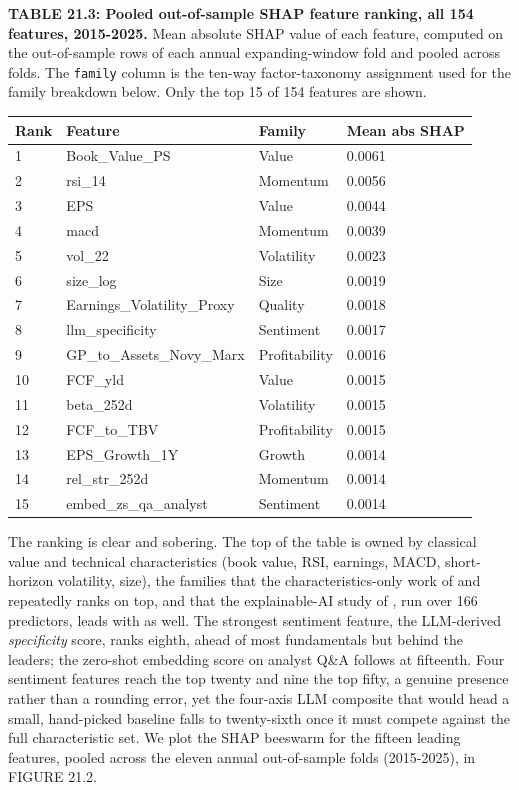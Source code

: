 \textbf{TABLE 21.3: Pooled out-of-sample SHAP feature ranking, all 154 features, 2015-2025.} Mean absolute SHAP value of each feature, computed on the out-of-sample rows of each annual expanding-window fold and pooled across folds. The \texttt{family} column is the ten-way factor-taxonomy assignment used for the family breakdown below. Only the top 15 of 154 features are shown.

\bigskip\noindent
\begin{tabular}{p{}p{}p{}p{}}
\toprule
Rank & Feature & Family & Mean abs SHAP \\
\hline
1 & Book\_Value\_PS & Value & 0.0061 \\
2 & rsi\_14 & Momentum & 0.0056 \\
3 & EPS & Value & 0.0044 \\
4 & macd & Momentum & 0.0039 \\
5 & vol\_22 & Volatility & 0.0023 \\
6 & size\_log & Size & 0.0019 \\
7 & Earnings\_Volatility\_Proxy & Quality & 0.0018 \\
8 & llm\_specificity & Sentiment & 0.0017 \\
9 & GP\_to\_Assets\_Novy\_Marx & Profitability & 0.0016 \\
10 & FCF\_yld & Value & 0.0015 \\
11 & beta\_252d & Volatility & 0.0015 \\
12 & FCF\_to\_TBV & Profitability & 0.0015 \\
13 & EPS\_Growth\_1Y & Growth & 0.0014 \\
14 & rel\_str\_252d & Momentum & 0.0014 \\
15 & embed\_zs\_qa\_analyst & Sentiment & 0.0014 \\
\bottomrule
\end{tabular}

\bigskip

The ranking is clear and sobering. The top of the table is owned by classical value and technical characteristics (book value, RSI, earnings, MACD, short-horizon volatility, size), the families that the characteristics-only work of \cite{freyberger2020dissecting} and \cite{han2024cross} repeatedly ranks on top, and that the explainable-AI study of \cite{goswami2025significance}, run over 166 predictors, leads with as well. The strongest sentiment feature, the LLM-derived \textit{specificity} score, ranks eighth, ahead of most fundamentals but behind the leaders; the zero-shot embedding score on analyst Q\&A follows at fifteenth. Four sentiment features reach the top twenty and nine the top fifty, a genuine presence rather than a rounding error, yet the four-axis LLM composite that would head a small, hand-picked baseline falls to twenty-sixth once it must compete against the full characteristic set. We plot the SHAP beeswarm for the fifteen leading features, pooled across the eleven annual out-of-sample folds (2015-2025), in FIGURE 21.2.

